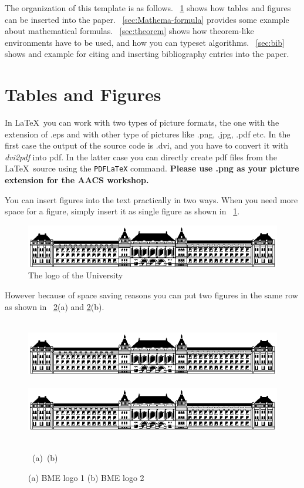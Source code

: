 \documentclass[twoside,b5paper,10pt]{article}
\begin{document}
The organization of this template is as follows.
\sectionname~\ref{sec:tables-figures} shows how tables and figures can be
inserted into the paper. \sectionname~\ref{sec:Mathema-formula} provides
some example about mathematical formulas. \sectionname~\ref{sec:theorem}
shows how theorem-like environments have to be used, and how you can
typeset algorithms. \sectionname~\ref{sec:bib} shows and example for
citing and inserting bibliography entries into the paper.

\section{Tables and Figures}
\label{sec:tables-figures}

In \LaTeX \ you can work with two types of picture formats, the one
with the extension of .eps and with other type of pictures like
.png, .jpg, .pdf etc. In the first case the output of the source
code is .dvi, and you have to convert it with \emph{dvi2pdf} into
pdf. In the latter case you can directly create pdf files from the
\LaTeX \ source using the \verb|PDFLaTeX| command. \textbf{Please
use .png as your picture extension for the AACS workshop.}

You can insert figures into the text practically in two ways. When
you need more space for a figure, simply insert it as single figure
as shown in \figurename~\ref{fig:simple}.

\begin{figure}[htb]
 \centerline{\includegraphics[width=.85\columnwidth]{.//Figure/BMElogo.png}}
 \caption{The logo of the University}
 \label{fig:simple}
\end{figure}

However because of space saving reasons you can put two figures in
the same row as shown in \figurename~\ref{fig:two}(a) and
\ref{fig:two}(b).
\begin{figure}[htb]
  \vspace{3pt}
  \centerline{
  \hbox{
  \hspace{0.0in}
        \includegraphics[width = 0.45\columnwidth]{Figure/BMElogo.png}
        \hspace{0.1\columnwidth}
        \includegraphics[width=0.45\columnwidth]{Figure/BMElogo.png}
    }
  }
  \vspace{3pt}
  \hbox{\hspace{0.2\columnwidth} (a) \hspace{0.5\columnwidth} (b)}
  \caption{ (a) BME logo 1 (b) BME logo 2}
  \label{fig:two}
\end{figure}
\end{document}
